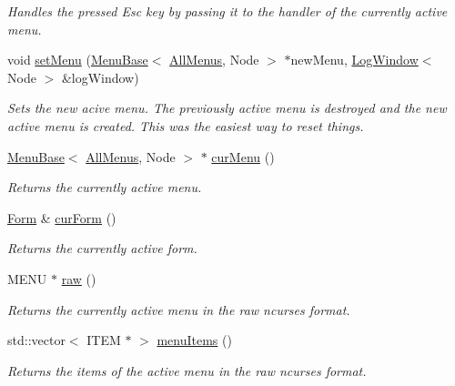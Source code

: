 \begin{DoxyCompactItemize}
\begin{DoxyCompactList}\small\item\em Handles the pressed Esc key by passing it to the handler of the currently active menu. \end{DoxyCompactList}\item 
void \hyperlink{structslb_1_1core_1_1ui_1_1AllMenus_a5cabf461bf71979f07a0f507e60baefe}{set\+Menu} (\hyperlink{structslb_1_1core_1_1ui_1_1MenuBase}{Menu\+Base}$<$ \hyperlink{structslb_1_1core_1_1ui_1_1AllMenus}{All\+Menus}, Node $>$ $\ast$new\+Menu, \hyperlink{structslb_1_1core_1_1ui_1_1LogWindow}{Log\+Window}$<$ Node $>$ \&log\+Window)
\begin{DoxyCompactList}\small\item\em Sets the new acive menu. The previously active menu is destroyed and the new active menu is created. This was the easiest way to reset things. \end{DoxyCompactList}\item 
\hyperlink{structslb_1_1core_1_1ui_1_1MenuBase}{Menu\+Base}$<$ \hyperlink{structslb_1_1core_1_1ui_1_1AllMenus}{All\+Menus}, Node $>$ $\ast$ \hyperlink{structslb_1_1core_1_1ui_1_1AllMenus_a84fab536b1f00eec48a3eaaf765fe27c}{cur\+Menu} ()
\begin{DoxyCompactList}\small\item\em Returns the currently active menu. \end{DoxyCompactList}\item 
\hyperlink{structslb_1_1core_1_1ui_1_1Form}{Form} \& \hyperlink{structslb_1_1core_1_1ui_1_1AllMenus_ad16885561afac21710be5effbaa0cb25}{cur\+Form} ()
\begin{DoxyCompactList}\small\item\em Returns the currently active form. \end{DoxyCompactList}\item 
M\+E\+NU $\ast$ \hyperlink{structslb_1_1core_1_1ui_1_1AllMenus_a059aff60e783f1c73783173327b81cf3}{raw} ()
\begin{DoxyCompactList}\small\item\em Returns the currently active menu in the raw {\ttfamily ncurses} format. \end{DoxyCompactList}\item 
std\+::vector$<$ I\+T\+EM $\ast$ $>$ \hyperlink{structslb_1_1core_1_1ui_1_1AllMenus_a531b3459a945dce28bbd8086d236be12}{menu\+Items} ()
\begin{DoxyCompactList}\small\item\em Returns the items of the active menu in the raw {\ttfamily ncurses} format. \end{DoxyCompactList}\end{DoxyCompactItemize}
